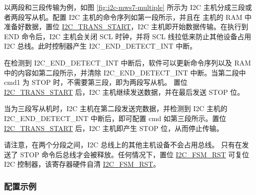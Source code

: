\documentclass[main\_\_CN.tex]{subfiles}
\begin{document}
以两段和三段传输为例，如图 \ref{fig:i2c-mws7-multiple} 所示为 I2C 主机分成三段或者两段写从机。配置 I2C 主机的命令序列如第一段所示，并且在 主机的 RAM 中准备好数据，置位 \hyperref[fielddesc:I2CTRANSSTART]{I2C\_TRANS\_START}，I2C 主机即开始数据传输。在执行到 END 命令后，I2C 主机会关闭 SCL 时钟，并将 SCL 线拉低来防止其他设备占用 I2C 总线。此时控制器产生 I2C\_END\_DETECT\_INT 中断。

在检测到 I2C\_END\_DETECT\_INT 中断后，软件可以更新命令序列以及 RAM 中的内容如第二段所示，并清除 I2C\_END\_DETECT\_INT 中断。当第二段中 cmd1 为 STOP 时，不需要第三段，即为两段写从机。 置位 \hyperref[fielddesc:I2CTRANSSTART]{I2C\_TRANS\_START} 后，I2C 主机继续发送数据，并在最后发送 STOP 位。

当为三段写从机时，I2C 主机在第二段发送完数据，并检测到 I2C 主机的 I2C\_END\_DETECT\_INT 中断后，即可配置 cmd 如第三段所示。置位 \hyperref[fielddesc:I2CTRANSSTART]{I2C\_TRANS\_START} 后，I2C 主机即产生 STOP 位，从而停止传输。

请注意，在两个分段之间，I2C 总线上的其他主机设备不会占用总线。 只有在发送了 STOP 命令后总线才会被释放。任何情况下，置位 \hyperref[fielddesc:I2CFSMRST]{I2C\_FSM\_RST} 可复位 I2C 控制器，该寄存器硬件自清 \hyperref[fielddesc:I2CFSMRST]{I2C\_FSM\_RST}。

\subsubsection{配置示例}
\end{document}

